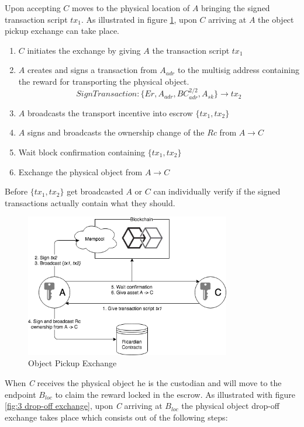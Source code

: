 Upon accepting $C$ moves to the physical location of $A$ bringing the signed transaction script $tx_1$. As illustrated in figure \ref{fig:2 first exchange}, upon $C$ arriving at $A$ the object pickup exchange can take place.

\begin{enumerate}
  \item $C$ initiates the exchange by giving $A$ the transaction script $tx_1$
  \item $A$ creates and signs a transaction from $A_{adr}$ to the multisig address containing the reward for transporting the physical object.
  \[SignTransaction \colon \{Er, A_{adr}, BC_{adr}^{2/2}, A_{sk}\} \rightarrow tx_2\]
  \item $A$ broadcasts the transport incentive into escrow $\{tx_1, tx_2\}$
  \item $A$ signs and broadcasts the ownership change of the $Rc$ from $A\rightarrow C$
  \item Wait block confirmation containing $\{tx_1, tx_2\}$
  \item Exchange the physical object from $A\rightarrow C$
\end{enumerate}

Before $\{tx_1, tx_2\}$ get broadcasted $A$ or $C$ can individually verify if the signed transactions actually contain what they should.

\begin{figure}[h]
\centering
\includegraphics[width=0.8\textwidth]{images/exchange_01.png}
\caption{Object Pickup Exchange}
\label{fig:2 first exchange}
\end{figure}

 When \textit{C} receives the physical object he is the custodian and will move to the endpoint $B_{loc}$ to claim the reward locked in the escrow. As illustrated with figure \ref{fig:3 drop-off exchange}, upon \textit{C} arriving at $B_{loc}$ the physical object drop-off exchange takes place which consists out of the following steps:

